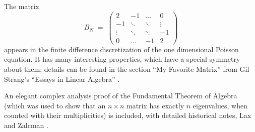 The matrix
\[
B_N \;=\; \begin{pmatrix}
2 & -1 & \dots & 0\\
-1 & \ddots & \ddots & \vdots\\
\vdots & \ddots & \ddots & -1\\
0 & \dots & -1 & 2
\end{pmatrix}
\]
appears in the finite difference discretization of the one dimensional Poisson
equation. It has many interesting properties, which have a special symmetry about
them; details can be found in the section ``My Favorite Matrix'' from Gil Strang's
``Essays in Linear Algebra'' \cite{42}.

An elegant complex analysis proof of the Fundamental Theorem of Algebra (which was
used to show that an $n \times n$ matrix has exactly $n$ eigenvalues, when counted
with their multiplicities) is included, with detailed historical notes, Lax and
Zalcman \cite{27}.
